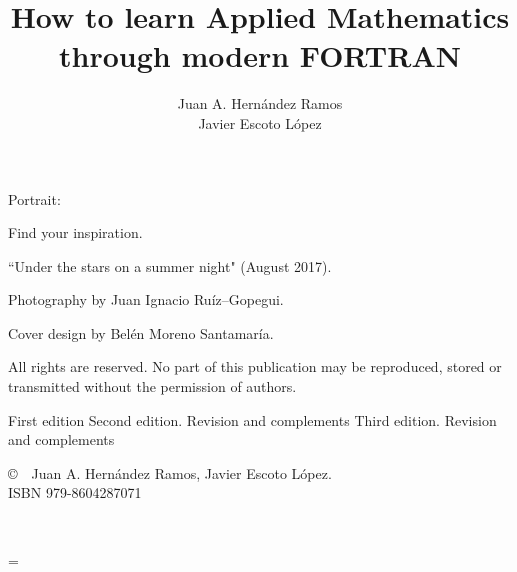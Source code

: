 \documentclass[twoside,english]{book}
\title{How to learn Applied Mathematics through modern FORTRAN}
\author{Juan A. Hern\'andez Ramos \\
            Javier Escoto L\'opez \\ \vspace{7cm} }
\date{ }
\begin{document}
    
    \maketitle
    \thispagestyle{empty}
    \clearpage
    

    
    \noindent Portrait:
    
    \noindent Find your inspiration.
    
    \noindent  ``Under the stars on a summer night" (August 2017). 
    
    \noindent  Photography by Juan Ignacio Ruíz--Gopegui. 
    
    \noindent  Cover design by Belén Moreno Santamaría.
    
       
    
    \vfill  
    
    \noindent
    All rights are reserved. No part of this publication may be reproduced, stored or transmitted without the permission of authors. 
    \vspace{2\baselineskip}
    
    
     First edition \newline
     Second edition. Revision and complements \newline    
     Third edition. Revision and complements \newline
    
    
    \noindent \copyright   \ \  Juan A. Hernández Ramos, Javier Escoto López. \\
    
    
    \noindent ISBN 979-8604287071 \\
     \clearpage
     
  
    \frontmatter
    \tableofcontents
    
     
    \newpage
    ~\clearpage
    
  
     
    \newpage
    \clearpage
    
  
    \mainmatter
    \parskip = \baselineskip
    \newcommand{\home}{./}
    
   
    

   
%   
%      
     
\end{document}
